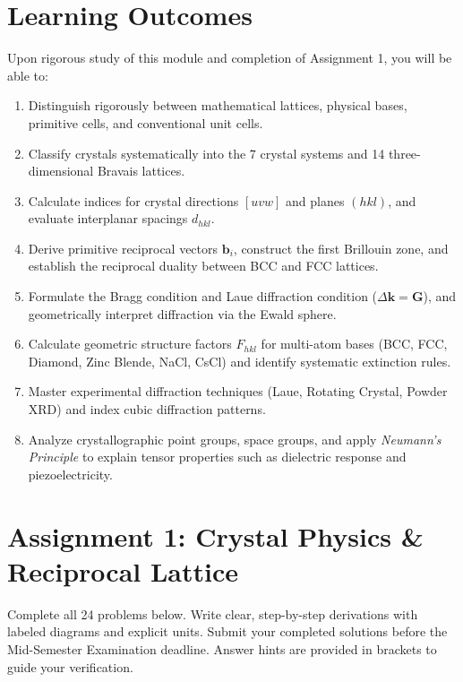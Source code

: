 \documentclass[11pt,a4paper]{article}
\begin{document}
\section*{Learning Outcomes}

Upon rigorous study of this module and completion of Assignment 1, you will be able to:
\begin{enumerate}[leftmargin=1.8em, label=\bfseries LO\arabic*:]
    \item Distinguish rigorously between mathematical lattices, physical bases, primitive cells, and conventional unit cells.
    \item Classify crystals systematically into the 7 crystal systems and 14 three-dimensional Bravais lattices.
    \item Calculate indices for crystal directions $[uvw]$ and planes $(hkl)$, and evaluate interplanar spacings $d_{hkl}$.
    \item Derive primitive reciprocal vectors $\mathbf{b}_i$, construct the first Brillouin zone, and establish the reciprocal duality between BCC and FCC lattices.
    \item Formulate the Bragg condition and Laue diffraction condition ($\Delta\mathbf{k} = \mathbf{G}$), and geometrically interpret diffraction via the Ewald sphere.
    \item Calculate geometric structure factors $F_{hkl}$ for multi-atom bases (BCC, FCC, Diamond, Zinc Blende, NaCl, CsCl) and identify systematic extinction rules.
    \item Master experimental diffraction techniques (Laue, Rotating Crystal, Powder XRD) and index cubic diffraction patterns.
    \item Analyze crystallographic point groups, space groups, and apply \emph{Neumann's Principle} to explain tensor properties such as dielectric response and piezoelectricity.
\end{enumerate}

\newpage

\section*{Assignment 1: Crystal Physics \& Reciprocal Lattice}

\begin{probbox}
Complete all 24 problems below. Write clear, step-by-step derivations with labeled diagrams and explicit units. Submit your completed solutions before the Mid-Semester Examination deadline. Answer hints are provided in brackets to guide your verification.
\end{probbox}
\end{document}
